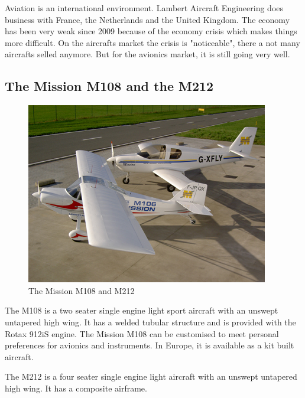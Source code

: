 \documentclass[11pt,a4paper]{article}
\begin{document}
\bigskip

Aviation is an international environment. Lambert Aircraft Engineering does business with France, the Netherlands and the United Kingdom. The economy has been very weak since 2009 because of the economy crisis which makes things more difficult. On the aircrafts market the crisis is "noticeable", there a not many aircrafts selled anymore. But for the avionics market, it is still going very well.

\newpage

\subsection{The Mission M108 and the M212}
\begin{figure}[ht!]
	\begin{center}
		\includegraphics[trim = 0cm 1cm 0cm 1cm,clip]{pics/PIC003.jpg}
		\caption{The Mission M108 and M212}
		\label{fig:PIC003}
	\end{center}
\end{figure}


The M108 is a two seater single engine light sport aircraft with an unswept untapered high wing. It has a welded tubular structure and is provided with the Rotax 912iS engine. The Mission M108 can be customised to meet personal preferences for avionics and instruments. In Europe, it is available as a kit built aircraft.

\bigskip

The M212 is a four seater single engine light aircraft with an unswept untapered high wing. It has a composite airframe.
\end{document}
